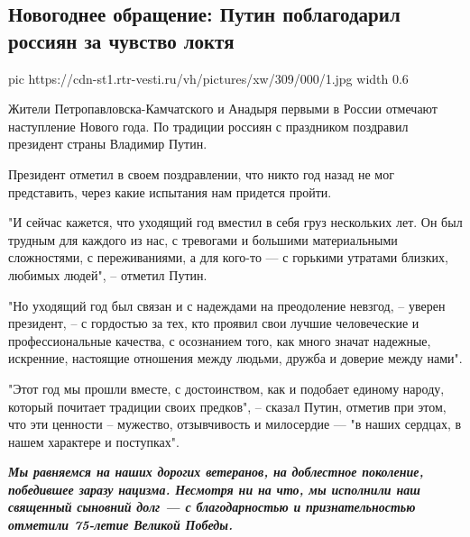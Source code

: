  
 
 
 
 
 
\subsection{Новогоднее обращение: Путин поблагодарил россиян за чувство локтя}
\label{sec:31_12_2020.news.ru.vesti.1.putin_new_year}


\ifcmt
  pic https://cdn-st1.rtr-vesti.ru/vh/pictures/xw/309/000/1.jpg
  width 0.6
\fi

Жители Петропавловска-Камчатского и Анадыря первыми в России отмечают
наступление Нового года. По традиции россиян с праздником поздравил президент
страны Владимир Путин.

Президент отметил в своем поздравлении, что никто год назад не мог представить,
через какие испытания нам придется пройти.

"И сейчас кажется, что уходящий год вместил в себя груз нескольких лет. Он был
трудным для каждого из нас, с тревогами и большими материальными сложностями, с
переживаниями, а для кого-то — с горькими утратами близких, любимых людей", –
отметил Путин.

"Но уходящий год был связан и с надеждами на преодоление невзгод, – уверен
президент, – с гордостью за тех, кто проявил свои лучшие человеческие и
профессиональные качества, с осознанием того, как много значат надежные,
искренние, настоящие отношения между людьми, дружба и доверие между нами".

"Этот год мы прошли вместе, с достоинством, как и подобает единому народу,
который почитает традиции своих предков", – сказал Путин, отметив при этом, что
эти ценности – мужество, отзывчивость и милосердие — "в наших сердцах, в нашем
характере и поступках".

\begin{leftbar}
  \begingroup
    \em\Large\bfseries\color{blue}
Мы равняемся на наших дорогих ветеранов, на доблестное поколение, победившее
заразу нацизма. Несмотря ни на что, мы исполнили наш священный сыновний долг —
с благодарностью и признательностью отметили 75-летие Великой Победы.
  \endgroup
\end{leftbar}

